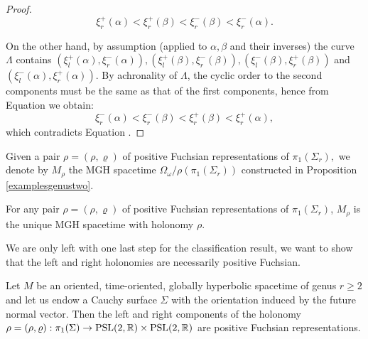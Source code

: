 \begin{proof}
\begin{equation}\label{58}
    \xi_r^+(\alpha)<\xi_r^+(\beta)<\xi_r^-(\beta)<\xi_r^-(\alpha).
\end{equation}

On the other hand, by assumption (applied to $\alpha,\beta$ and their inverses) the curve $\Lambda$ contains $(\xi_l^+(\alpha),\xi_r^-(\alpha)),(\xi_l^+(\beta),\xi _r^-(\beta)), (\xi_l^-(\beta ),\xi_r^+(\beta ))$ and $(\xi_l^-(\alpha),\xi_r^+(\alpha)).$ By achronality of $\Lambda$, the cyclic order to the second components must be the same as that of the first components, hence from Equation  we obtain: 
\[
    \xi_r^-(\alpha)<\xi_r^-(\beta)<\xi_r^+(\beta)<\xi_r^+(\alpha),
\]
which contradicts Equation .
\end{proof}

Given a pair $\rho=(\rho,\varrho)$ of positive Fuchsian representations of $\pi_1(\Sigma_r),$ we denote by $M_\rho$ the MGH spacetime $\Omega_\omega/\rho(\pi_1(\Sigma_r))$ constructed in Proposition \ref{examplesgenustwo}.

\begin{corollary}
    For any pair $\rho=(\rho,\varrho)$ of positive Fuchsian representations of $\pi_1(\Sigma_r)$, $M_\rho$ is the unique MGH spacetime with holonomy $\rho$.
\end{corollary}

We are only left with one last step for the classification result, we want to show that the left and right holonomies are necessarily positive Fuchsian. 

\begin{proposition}\label{553}
    Let $M$ be an oriented, time-oriented, globally hyperbolic spacetime of genus $r\geq 2$ and let us endow a Cauchy surface $\Sigma$ with the orientation induced by the future normal vector. Then the left and right components of the holonomy $\rho=(\rho,\varrho):\pi_1(\Sigma)\to\text{PSL}(2,\mathbb{R})\times\text{PSL}(2,\mathbb{R})$ are positive Fuchsian representations. 
\end{proposition}

